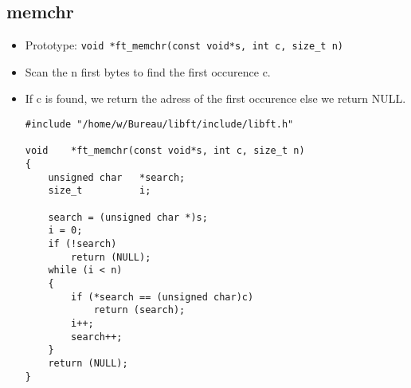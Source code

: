\documentclass{article}
\begin{document}
		\subsection{memchr}
			\begin{itemize}[label=$\rightarrow$]
				\item Prototype: \texttt{void    *ft\_memchr(const void*s, int c, size\_t n) }
				\item Scan the n first bytes to find the first occurence c.
				\item If c is found, we return the adress of the first occurence else we return NULL.
				\begin{verbatim}
#include "/home/w/Bureau/libft/include/libft.h"                                 
                                                                                
void    *ft_memchr(const void*s, int c, size_t n)                               
{                                                                               
    unsigned char   *search;                                                    
    size_t          i;                                                          
                                                                                
    search = (unsigned char *)s;                                                
    i = 0;                                                                      
    if (!search)                                                                
        return (NULL);                                                          
    while (i < n)                                                               
    {                                                                           
        if (*search == (unsigned char)c)                                        
            return (search);                                                    
        i++;                                                                    
        search++;                                                               
    }                                                                           
    return (NULL);                                                              
} 
				\end{verbatim}
			\end{itemize}
		
\end{document}
